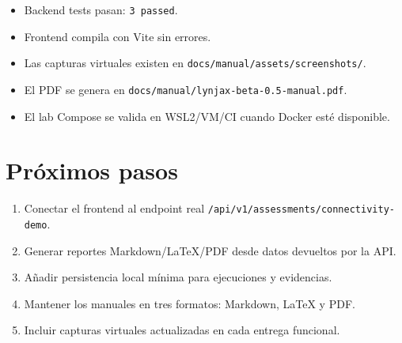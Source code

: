 \documentclass[11pt,letterpaper]{article}
\begin{document}
\begin{itemize}
  \item Backend tests pasan: \texttt{3 passed}.
  \item Frontend compila con Vite sin errores.
  \item Las capturas virtuales existen en \texttt{docs/manual/assets/screenshots/}.
  \item El PDF se genera en \texttt{docs/manual/lynjax-beta-0.5-manual.pdf}.
  \item El lab Compose se valida en WSL2/VM/CI cuando Docker esté disponible.
\end{itemize}

\section{Próximos pasos}

\begin{enumerate}
  \item Conectar el frontend al endpoint real \texttt{/api/v1/assessments/connectivity-demo}.
  \item Generar reportes Markdown/LaTeX/PDF desde datos devueltos por la API.
  \item Añadir persistencia local mínima para ejecuciones y evidencias.
  \item Mantener los manuales en tres formatos: Markdown, LaTeX y PDF.
  \item Incluir capturas virtuales actualizadas en cada entrega funcional.
\end{enumerate}
\end{document}
